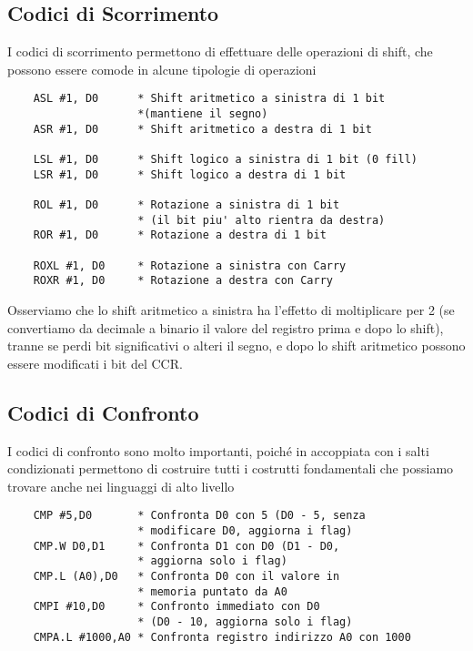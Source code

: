 \subsection{Codici di Scorrimento}
I codici di scorrimento permettono di effettuare delle operazioni di shift, che possono essere comode in alcune tipologie di operazioni
\begin{lstlisting}
    ASL #1, D0      * Shift aritmetico a sinistra di 1 bit 
                    *(mantiene il segno)
    ASR #1, D0      * Shift aritmetico a destra di 1 bit

    LSL #1, D0      * Shift logico a sinistra di 1 bit (0 fill)
    LSR #1, D0      * Shift logico a destra di 1 bit

    ROL #1, D0      * Rotazione a sinistra di 1 bit 
                    * (il bit piu' alto rientra da destra)
    ROR #1, D0      * Rotazione a destra di 1 bit

    ROXL #1, D0     * Rotazione a sinistra con Carry
    ROXR #1, D0     * Rotazione a destra con Carry
\end{lstlisting}

Osserviamo che lo shift aritmetico a sinistra ha l'effetto di moltiplicare per 2 (se convertiamo da decimale a binario il valore del registro prima e dopo lo shift), tranne se perdi bit significativi o alteri il segno, e dopo lo shift aritmetico possono essere modificati i bit del CCR.

\subsection{Codici di Confronto} \label{par:confronto}
I codici di confronto sono molto importanti, poiché in accoppiata con i salti condizionati permettono di costruire tutti i costrutti fondamentali che possiamo trovare anche nei linguaggi di alto livello
\begin{lstlisting}
    CMP #5,D0       * Confronta D0 con 5 (D0 - 5, senza 
                    * modificare D0, aggiorna i flag)
    CMP.W D0,D1     * Confronta D1 con D0 (D1 - D0, 
                    * aggiorna solo i flag)
    CMP.L (A0),D0   * Confronta D0 con il valore in 
                    * memoria puntato da A0
    CMPI #10,D0     * Confronto immediato con D0
                    * (D0 - 10, aggiorna solo i flag)
    CMPA.L #1000,A0 * Confronta registro indirizzo A0 con 1000
\end{lstlisting}

